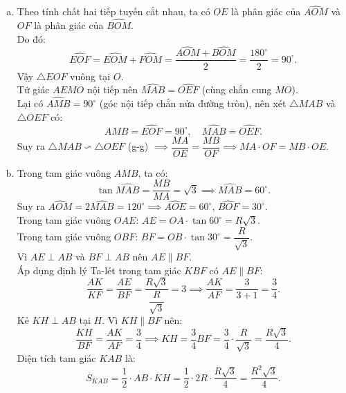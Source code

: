 \begin{bt}
{\begin{enumerate}[a)]
    Vì $EF$ là tiếp tuyến của $(O)$ tại $M$ nên $\widehat{EMO} = 90^\circ$, suy ra tam giác $EMO$ nội tiếp đường tròn đường kính $EO$.\\
    Do đó, $4$ điểm $A, E, M, O$ cùng thuộc đường tròn đường kính $EO$.\\
    Vậy tứ giác $AEMO$ nội tiếp đường tròn có tâm là trung điểm của $EO$ và bán kính bằng $\dfrac{EO}{2}$.
    \item Theo tính chất hai tiếp tuyến cắt nhau, ta có $OE$ là phân giác của $\widehat{AOM}$ và $OF$ là phân giác của $\widehat{BOM}$.\\
    Do đó:
    $$\widehat{EOF} = \widehat{EOM} + \widehat{FOM} = \dfrac{\widehat{AOM} + \widehat{BOM}}{2} = \dfrac{180^\circ}{2} = 90^\circ.$$
    Vậy $\triangle EOF$ vuông tại $O$.\\
    Tứ giác $AEMO$ nội tiếp nên $\widehat{MAB} = \widehat{OEF}$ (cùng chắn cung $MO$).\\
    Lại có $\widehat{AMB} = 90^\circ$ (góc nội tiếp chắn nửa đường tròn), nên xét $\triangle MAB$ và $\triangle OEF$ có:
    $$\widehat{AMB} = \widehat{EOF} = 90^\circ, \quad \widehat{MAB} = \widehat{OEF}.$$
    Suy ra $\triangle MAB \backsim \triangle OEF$ (g-g) $\implies \dfrac{MA}{OE} = \dfrac{MB}{OF} \implies MA \cdot OF = MB \cdot OE$.
    \item Trong tam giác vuông $AMB$, ta có:
    $$\tan \widehat{MAB} = \dfrac{MB}{MA} = \sqrt{3} \implies \widehat{MAB} = 60^\circ.$$
    Suy ra $\widehat{AOM} = 2\widehat{MAB} = 120^\circ \implies \widehat{AOE} = 60^\circ$, $\widehat{BOF} = 30^\circ$.\\
    Trong tam giác vuông $OAE$: $AE = OA \cdot \tan 60^\circ = R\sqrt{3}$.\\
    Trong tam giác vuông $OBF$: $BF = OB \cdot \tan 30^\circ = \dfrac{R}{\sqrt{3}}$.\\
    Vì $AE \perp AB$ và $BF \perp AB$ nên $AE \parallel BF$.\\
    Áp dụng định lý Ta-lét trong tam giác $KBF$ có $AE \parallel BF$:
    $$\dfrac{AK}{KF} = \dfrac{AE}{BF} = \dfrac{R\sqrt{3}}{\dfrac{R}{\sqrt{3}}} = 3 \implies \dfrac{AK}{AF} = \dfrac{3}{3 + 1} = \dfrac{3}{4}.$$
    Kẻ $KH \perp AB$ tại $H$. Vì $KH \parallel BF$ nên:
    $$\dfrac{KH}{BF} = \dfrac{AK}{AF} = \dfrac{3}{4} \implies KH = \dfrac{3}{4}BF = \dfrac{3}{4} \cdot \dfrac{R}{\sqrt{3}} = \dfrac{R\sqrt{3}}{4}.$$
    Diện tích tam giác $KAB$ là:
    $$S_{KAB} = \dfrac{1}{2} \cdot AB \cdot KH = \dfrac{1}{2} \cdot 2R \cdot \dfrac{R\sqrt{3}}{4} = \dfrac{R^2\sqrt{3}}{4}.$$
\end{enumerate}
}
\end{bt}


